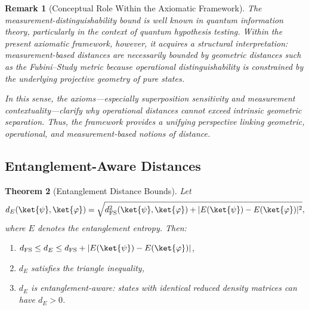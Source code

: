 \documentclass[aps,pra,reprint,nofootinbib,showpacs,superscriptaddress]{revtex4-1}
\newtheorem{theorem}{Theorem}[section]
\newtheorem{remark}[theorem]{Remark}
\begin{document}
\begin{remark}[Conceptual Role Within the Axiomatic Framework]
The measurement-distinguishability bound is well known in quantum information theory, 
particularly in the context of quantum hypothesis testing. 
Within the present axiomatic framework, however, it acquires a structural interpretation: 
measurement-based distances are necessarily bounded by geometric distances such as the Fubini--Study metric because operational distinguishability is constrained by the underlying projective geometry of pure states.

In this sense, the axioms—especially superposition sensitivity and measurement contextuality—clarify why operational distances cannot exceed intrinsic geometric separation. 
Thus, the framework provides a unifying perspective linking geometric, operational, and measurement-based notions of distance.
\end{remark}









\subsection{Entanglement-Aware Distances}

\begin{theorem}[Entanglement Distance Bounds]
\label{thm:entanglement-bounds}
Let 
\[
d_E(\ket{\psi},\ket{\varphi}) = \sqrt{d_{\text{FS}}^2(\ket{\psi},\ket{\varphi}) + |E(\ket{\psi}) - E(\ket{\varphi})|^2},
\] 
where $E$ denotes the entanglement entropy. Then:
\begin{enumerate}[label=(\roman*)]
    \item $d_{\text{FS}} \le d_E \le d_{\text{FS}} + |E(\ket{\psi}) - E(\ket{\varphi})|$,
    \item $d_E$ satisfies the triangle inequality,
    \item $d_E$ is entanglement-aware: states with identical reduced density matrices can have $d_E>0$.
\end{enumerate}
\end{theorem}
\end{document}
